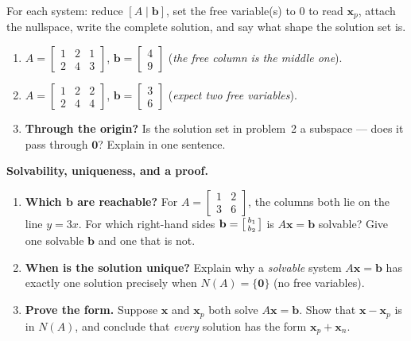 \documentclass[10pt]{article}
\newcommand{\xx}{\mathbf{x}}
\newcommand{\bb}{\mathbf{b}}
\newcommand{\zero}{\mathbf{0}}
\begin{document}
\begin{tcolorbox}[colback=white, colframe=black!40, title=\textbf{Tier A --- Approaching Proficiency},
    fonttitle=\bfseries, arc=1.5mm, left=3mm, right=3mm, top=2mm, bottom=2mm, breakable]
For each system: reduce $[A\mid\bb]$, set the free variable(s) to $0$ to read $\xx_p$, attach the
nullspace, write the complete solution, and say what shape the solution set is.
\begin{enumerate}[leftmargin=1.7em, itemsep=9pt]
  \item $A=\begin{bmatrix} 1 & 2 & 1 \\ 2 & 4 & 3 \end{bmatrix}$, $\bb=\begin{bmatrix} 4 \\ 9 \end{bmatrix}$ \quad (\emph{the free column is the middle one}). 
  \item $A=\begin{bmatrix} 1 & 2 & 2 \\ 2 & 4 & 4 \end{bmatrix}$, $\bb=\begin{bmatrix} 3 \\ 6 \end{bmatrix}$ \quad (\emph{expect two free variables}). 
  \item \textbf{Through the origin?} Is the solution set in problem~2 a subspace --- does it pass through
        $\zero$? Explain in one sentence. 
\end{enumerate}
\end{tcolorbox}

\begin{tcolorbox}[colback=white, colframe=black!40, title=\textbf{Tier E --- Extension},
    fonttitle=\bfseries, arc=1.5mm, left=3mm, right=3mm, top=2mm, bottom=2mm, breakable]
\textbf{Solvability, uniqueness, and a proof.}
\begin{enumerate}[leftmargin=1.7em, itemsep=9pt]
  \item \textbf{Which $\bb$ are reachable?} For $A=\begin{bmatrix} 1 & 2 \\ 3 & 6 \end{bmatrix}$, the columns
        both lie on the line $y=3x$. For which right-hand sides $\bb=\begin{bsmallmatrix} b_1\\b_2 \end{bsmallmatrix}$
        is $A\xx=\bb$ solvable? Give one solvable $\bb$ and one that is not. 
  \item \textbf{When is the solution unique?} Explain why a \emph{solvable} system $A\xx=\bb$ has exactly
        one solution precisely when $N(A)=\{\zero\}$ (no free variables). 
  \item \textbf{Prove the form.} Suppose $\xx$ and $\xx_p$ both solve $A\xx=\bb$. Show that $\xx-\xx_p$ is
        in $N(A)$, and conclude that \emph{every} solution has the form $\xx_p+\xx_n$. 
\end{enumerate}
\end{tcolorbox}
\end{document}
